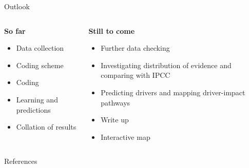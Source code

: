 \documentclass[9pt]{beamer}
\begin{document}
\begin{frame}{Outlook}
\begin{columns}[t]
	\begin{column}{0.5\linewidth}
		\textbf{So far}
		
		\begin{itemize}
			\item Data collection
			\item Coding scheme
			\item Coding
			\item Learning and predictions
			\item Collation of results
		\end{itemize}
	\end{column}
	\begin{column}{0.5\linewidth}
		\textbf{Still to come}
		\begin{itemize}
			\item Further data checking
			\item Investigating distribution of evidence and comparing with IPCC
			\item Predicting drivers and mapping driver-impact pathways
			\item Write up
			\item Interactive map
		\end{itemize}
	\end{column}
\end{columns}
\end{frame}


\begin{frame}{References}

\end{frame}
\end{document}
